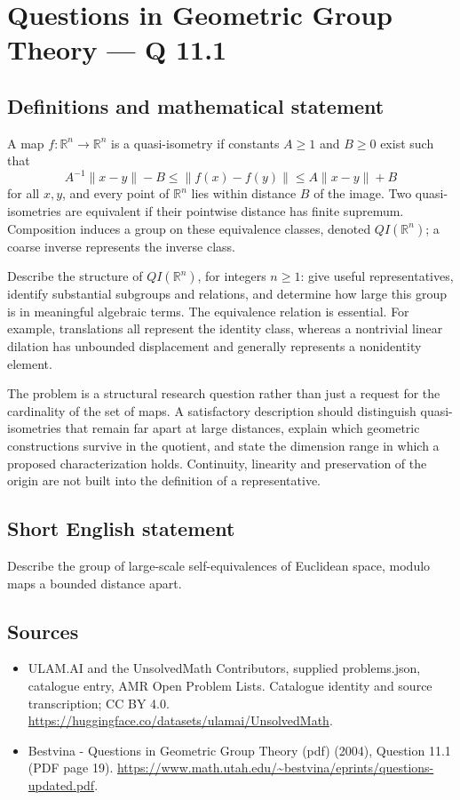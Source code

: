 \documentclass[11pt,a4paper]{article}
\begin{document}
\section*{Questions in Geometric Group Theory — Q 11.1}\label{statement}

\subsection{Definitions and mathematical statement}
A map $f:\mathbb R^n\to\mathbb R^n$ is a quasi-isometry if constants $A\geq1$ and $B\geq0$ exist such that
\[
 A^{-1}\lVert x-y\rVert-B\leq\lVert f(x)-f(y)\rVert
       \leq A\lVert x-y\rVert+B
\]
for all $x,y$, and every point of $\mathbb R^n$ lies within distance $B$ of the image. Two quasi-isometries are equivalent if their pointwise distance has finite supremum. Composition induces a group on these equivalence classes, denoted $QI(\mathbb R^n)$; a coarse inverse represents the inverse class.

Describe the structure of $QI(\mathbb R^n)$, for integers $n\geq1$: give useful representatives, identify substantial subgroups and relations, and determine how large this group is in meaningful algebraic terms. The equivalence relation is essential. For example, translations all represent the identity class, whereas a nontrivial linear dilation has unbounded displacement and generally represents a nonidentity element.

The problem is a structural research question rather than just a request for the cardinality of the set of maps. A satisfactory description should distinguish quasi-isometries that remain far apart at large distances, explain which geometric constructions survive in the quotient, and state the dimension range in which a proposed characterization holds. Continuity, linearity and preservation of the origin are not built into the definition of a representative.
\subsection{Short English statement}
Describe the group of large-scale self-equivalences of Euclidean space, modulo maps a bounded distance apart.
\subsection{Sources}
\begin{itemize}
\item[S1] ULAM.AI and the UnsolvedMath Contributors, supplied problems.json, catalogue entry, AMR Open Problem Lists. Catalogue identity and source transcription; CC BY 4.0.
\url{https://huggingface.co/datasets/ulamai/UnsolvedMath}.
\item[S2] Bestvina - Questions in Geometric Group Theory (pdf) (2004), Question 11.1 (PDF page 19). 
\url{https://www.math.utah.edu/~bestvina/eprints/questions-updated.pdf}.
\end{itemize}
\end{document}
